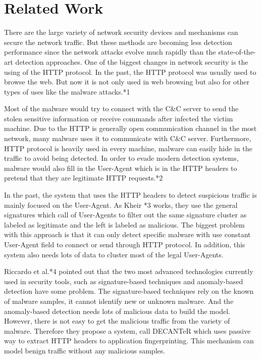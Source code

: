\section{Related Work}
There are the large variety of network security devices and mechanisms can secure the network traffic. But these methods are becoming less detection performance since the network attacks evolve much rapidly than the state-of-the-art detection approaches. One of the biggest changes in network security is the using of the HTTP protocol. In the past, the HTTP protocol was usually used to browse the web. But now it is not only used in web browsing but also for other types of uses like the malware attacks.*1

Most of the malware would try to connect with the C\&C server to send the stolen sensitive information or receive commands after infected the victim machine. Due to the HTTP is generally open communication channel in the most network, many malware uses it to communicate with C\&C server. Furthermore, HTTP protocol is heavily used in every machine, malware can easily hide in the traffic to avoid being detected. In order to evade modern detection systems, malware would also fill in the User-Agent which is in the HTTP headers to pretend that they are legitimate HTTP requests.*2

In the past, the system that uses the HTTP headers to detect suspicious traffic is mainly focused on the User-Agent. As Kheir *3 works, they use the general signatures which call of User-Agents to filter out the same signature cluster as labeled as legitimate and the left is labeled as malicious. The biggest problem with this approach is that it can only detect specific malware with use constant User-Agent field to connect or send through HTTP protocol. In addition, this system also needs lots of data to cluster most of the legal User-Agents.

Riccardo et al.*4 pointed out that the two most advanced technologies currently used in security tools, such as signature-based techniques and anomaly-based detection have some problem. The signature-based techniques rely on the known of malware samples, it cannot identify new or unknown malware. And the anomaly-based detection needs lots of malicious data to build the model. However, there is not easy to get the malicious traffic from the variety of malware. Therefore they propose a system, call DECANTeR which uses passive way to extract HTTP headers to application fingerprinting. This mechanism can model benign traffic without any malicious samples.

